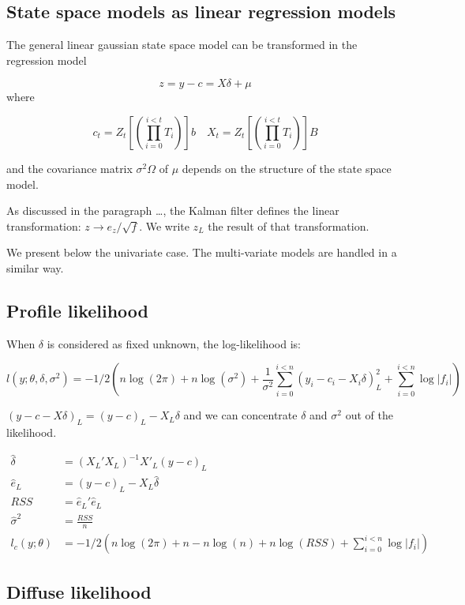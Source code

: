 \documentclass[
  letterpaper,
  DIV=11,
  numbers=noendperiod]{scrreprt}
\begin{document}
\subsection{State space models as linear regression
models}\label{state-space-models-as-linear-regression-models}

The general linear gaussian state space model can be transformed in the
regression model

\[z = y - c = X \delta + \mu  \] where

\[c_t= Z_t\left[ \left(\prod_{i=0}^{i<t}{T_i}\right)\right]b \quad X_t = Z_t\left[ \left(\prod_{i=0}^{i<t}{T_i}\right)\right]B \]

and the covariance matrix \(\sigma^2\Omega\) of \(\mu\) depends on the
structure of the state space model.

As discussed in the paragraph \ldots, the Kalman filter defines the
linear transformation: \(z \rightarrow e_z/\sqrt{f}\). We write \(z_L\)
the result of that transformation.

We present below the univariate case. The multi-variate models are
handled in a similar way.

\subsection{Profile likelihood}\label{profile-likelihood}

When \(\delta\) is considered as fixed unknown, the log-likelihood is:

\[
l(y;\theta, \delta, \sigma^2)=-1/2\left(n \log(2 \pi) + n \log(\sigma^2)  +  \frac{1}{\sigma^2}\sum_{i=0}^{i<n} (y_i-c_i-X_i \delta)_L^2 + \sum_{i=0}^{i<n} {\log \vert f_i \vert }\right)
\]

\((y-c-X \delta)_L = (y-c)_L - X_L \delta\) and we can concentrate
\(\delta\) and \(\sigma^2\) out of the likelihood.

\[ \begin{align*}
\hat{\delta} &= (X_L'X_L)^{-1}X'_L(y-c)_L \\
\hat{e}_L &= (y-c)_L - X_L \hat{\delta} \\
RSS &= \hat{e}_L' \hat{e}_L \\
\hat{\sigma}^2 &= \frac{RSS}{n} \\
l_c(y; \theta)&=-1/2\left(n \log(2 \pi) + n - n \log(n) + n \log(RSS) + \sum_{i=0}^{i<n} {\log \vert f_i \vert }\right)
\end{align*} 
\]

\subsection{Diffuse likelihood}\label{diffuse-likelihood}
\end{document}

